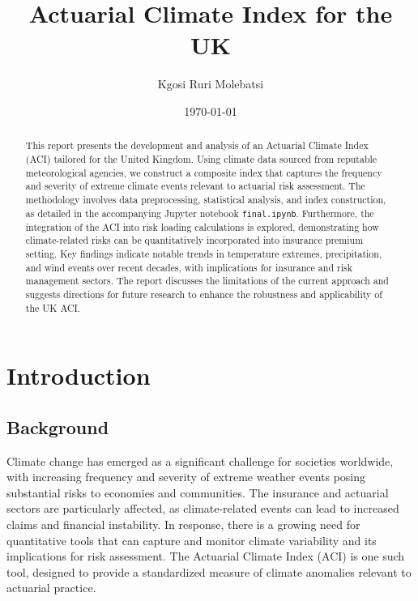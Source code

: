 \documentclass[12pt,a4paper]{report}
\title{Actuarial Climate Index for the UK}
\author{Kgosi Ruri Molebatsi}
\date{\today}
\begin{document}
\maketitle

\begin{abstract}
This report presents the development and analysis of an Actuarial Climate Index (ACI) tailored for the United Kingdom. 
Using climate data sourced from reputable meteorological agencies, we construct a composite index that captures the frequency and severity of extreme climate events relevant to actuarial risk assessment. 
The methodology involves data preprocessing, statistical analysis, and index construction, as detailed in the accompanying Jupyter notebook \texttt{final.ipynb}. 
Furthermore, the integration of the ACI into risk loading calculations is explored, demonstrating how climate-related risks can be quantitatively incorporated into insurance premium setting. 
Key findings indicate notable trends in temperature extremes, precipitation, and wind events over recent decades, with implications for insurance and risk management sectors. 
The report discusses the limitations of the current approach and suggests directions for future research to enhance the robustness and applicability of the UK ACI.
\end{abstract}

\tableofcontents
\listoffigures
\listoftables

\chapter{Introduction}

\section{Background}
Climate change has emerged as a significant challenge for societies worldwide, with increasing frequency and severity of extreme weather events posing substantial risks to economies and communities. 
The insurance and actuarial sectors are particularly affected, as climate-related events can lead to increased claims and financial instability. 
In response, there is a growing need for quantitative tools that can capture and monitor climate variability and its implications for risk assessment. 
The Actuarial Climate Index (ACI) is one such tool, designed to provide a standardized measure of climate anomalies relevant to actuarial practice.
\end{document}
